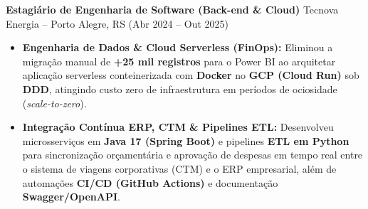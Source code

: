 \documentclass[10pt, letterpaper]{article}
\begin{document}
\vspace{1.5pt}
\textbf{Estagi\'ario de Engenharia de Software (Back-end \& Cloud)} \hfill Tecnova Energia -- Porto Alegre, RS \hfill (Abr 2024 -- Out 2025)
\begin{itemize}[itemsep=0.5pt, topsep=1pt, parsep=0pt, leftmargin=10pt]
    \item \textbf{Engenharia de Dados \& Cloud Serverless (FinOps):} Eliminou a migra\c{c}\~ao manual de \textbf{+25 mil registros} para o Power BI ao arquitetar aplica\c{c}\~ao serverless conteinerizada com \textbf{Docker} no \textbf{GCP (Cloud Run)} sob \textbf{DDD}, atingindo custo zero de infraestrutura em per\'iodos de ociosidade (\textit{scale-to-zero}).
    \item \textbf{Integra\c{c}\~ao Cont\'inua ERP, CTM \& Pipelines ETL:} Desenvolveu microsservi\c{c}os em \textbf{Java 17 (Spring Boot)} e pipelines \textbf{ETL em Python} para sincroniza\c{c}\~ao or\c{c}ament\'aria e aprova\c{c}\~ao de despesas em tempo real entre o sistema de viagens corporativas (CTM) e o ERP empresarial, al\'em de automa\c{c}\~oes \textbf{CI/CD (GitHub Actions)} e documenta\c{c}\~ao \textbf{Swagger/OpenAPI}.
\end{itemize}
\end{document}
